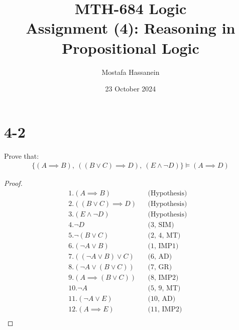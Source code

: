 \documentclass{article}
\author{Mostafa Hassanein}
\title{
  MTH-684 Logic \\
  Assignment (4): Reasoning in Propositional Logic}
\date{23 October 2024}
\begin{document}
\maketitle
\newpage

\section*{4-2}
Prove that:
\begin{align*}
  \{ (A \implies B), \: ((B \lor C) \implies D), \: (E \land \lnot D) \}  \models (A \implies D)
\end{align*}

\begin{proof}

  \begin{align*}
    &1. (A \implies B) &&\text{(Hypothesis)} &&\\
    &2. ((B \lor C) \implies D) &&\text{(Hypothesis)} &&\\
    &3. (E \land \lnot D) &&\text{(Hypothesis)} &&\\
    &4. \lnot D &&\text{(3, SIM)} &&\\
    &5. \lnot (B \lor C) &&\text{(2, 4, MT)} &&\\
    &6. (\lnot A \lor B) &&\text{(1, IMP1)} &&\\
    &7. ((\lnot A \lor B) \lor C) &&\text{(6, AD)} &&\\
    &8. (\lnot A \lor (B \lor C)) &&\text{(7, GR)} &&\\
    &9. (A \implies (B \lor C)) &&\text{(8, IMP2)} &&\\
    &10. \lnot A &&\text{(5, 9, MT)} &&\\
    &11. (\lnot A \lor E) &&\text{(10, AD)} &&\\
    &12. (A \implies E) &&\text{(11, IMP2)} &&\\
  \end{align*}

\end{proof}
\end{document}
